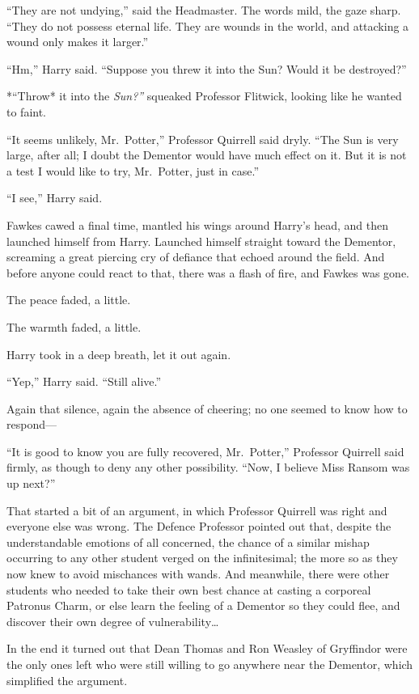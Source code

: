 ``They are not undying,'' said the Headmaster. The words mild, the gaze
sharp. ``They do not possess eternal life. They are wounds in the world,
and attacking a wound only makes it larger.''

``Hm,'' Harry said. ``Suppose you threw it into the Sun? Would it be
destroyed?''

*``Throw* it into the \emph{Sun?''} squeaked Professor Flitwick, looking
like he wanted to faint.

``It seems unlikely, Mr.~Potter,'' Professor Quirrell said dryly. ``The
Sun is very large, after all; I doubt the Dementor would have much
effect on it. But it is not a test I would like to try, Mr.~Potter, just
in case.''

``I see,'' Harry said.

Fawkes cawed a final time, mantled his wings around Harry's head, and
then launched himself from Harry. Launched himself straight toward the
Dementor, screaming a great piercing cry of defiance that echoed around
the field. And before anyone could react to that, there was a flash of
fire, and Fawkes was gone.

The peace faded, a little.

The warmth faded, a little.

Harry took in a deep breath, let it out again.

``Yep,'' Harry said. ``Still alive.''

Again that silence, again the absence of cheering; no one seemed to know
how to respond---

``It is good to know you are fully recovered, Mr.~Potter,'' Professor
Quirrell said firmly, as though to deny any other possibility. ``Now, I
believe Miss Ransom was up next?''

That started a bit of an argument, in which Professor Quirrell was right
and everyone else was wrong. The Defence Professor pointed out that,
despite the understandable emotions of all concerned, the chance of a
similar mishap occurring to any other student verged on the
infinitesimal; the more so as they now knew to avoid mischances with
wands. And meanwhile, there were other students who needed to take their
own best chance at casting a corporeal Patronus Charm, or else learn the
feeling of a Dementor so they could flee, and discover their own degree
of vulnerability\ldots{}

In the end it turned out that Dean Thomas and Ron Weasley of Gryffindor
were the only ones left who were still willing to go anywhere near the
Dementor, which simplified the argument.

